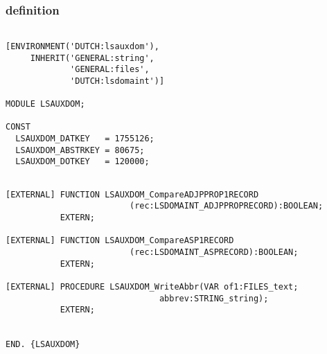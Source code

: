 \subsubsection{definition}
\begin{verbatim}

[ENVIRONMENT('DUTCH:lsauxdom'),
     INHERIT('GENERAL:string',
             'GENERAL:files',
             'DUTCH:lsdomaint')]

MODULE LSAUXDOM;

CONST
  LSAUXDOM_DATKEY   = 1755126;
  LSAUXDOM_ABSTRKEY = 80675;
  LSAUXDOM_DOTKEY   = 120000;
\end{verbatim}
\pagebreak
\begin{verbatim}

[EXTERNAL] FUNCTION LSAUXDOM_CompareADJPPROP1RECORD
                         (rec:LSDOMAINT_ADJPPROPRECORD):BOOLEAN;
           EXTERN;

[EXTERNAL] FUNCTION LSAUXDOM_CompareASP1RECORD
                         (rec:LSDOMAINT_ASPRECORD):BOOLEAN;
           EXTERN;

[EXTERNAL] PROCEDURE LSAUXDOM_WriteAbbr(VAR of1:FILES_text;
                               abbrev:STRING_string);
           EXTERN;


END. {LSAUXDOM}

\end{verbatim}
